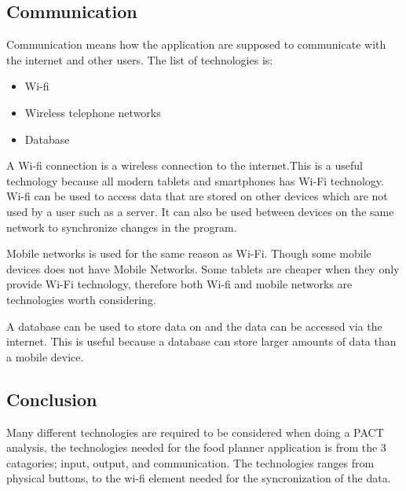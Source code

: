 \subsection{Communication}

Communication means how the application are supposed to communicate with the internet and other users. The list of technologies is:

\begin{itemize}
	\item Wi-fi
	\item Wireless telephone networks    
    \item Database
\end{itemize}

A Wi-fi connection is a wireless connection to the internet.This is a useful technology because all modern tablets and smartphones has Wi-Fi technology. Wi-fi can be used to access data that are stored on other devices which are not used by a user such as a server. It can also be used between devices on the same network to synchronize changes in the program.    

Mobile networks is used for the same reason as Wi-Fi. Though some mobile devices does not have Mobile Networks. Some tablets are cheaper when they only provide Wi-Fi technology, therefore both Wi-fi and mobile networks are technologies worth considering.

A database can be used to store data on and the data can be accessed via the internet. This is useful because a database can store larger amounts of data than a mobile device. 
 
\subsection{Conclusion}

Many different technologies are required to be considered when doing a PACT analysis, the technologies needed for the food planner application is from the 3 catagories; input, output, and communication. The technologies ranges from physical buttons, to the wi-fi element needed for the syncronization of the data.
